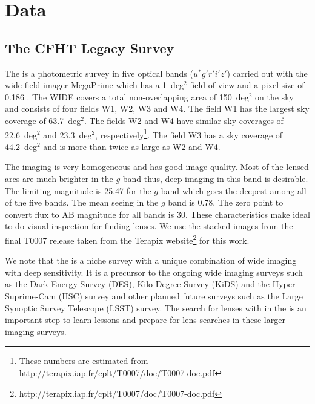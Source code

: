 \documentclass[useAMS,usenatbib,a4paper]{mn2e}
\begin{document}

\section{Data}
\label{sec:data}
\subsection{The CFHT Legacy Survey}
\label{sec:data:cfhtls}

The \cfhtls is a photometric survey in five optical bands
($u^*g'r'i'z'$) carried out with the wide-field imager MegaPrime which
has a 1~deg$^2$ field-of-view and a pixel size of 0.186\arcsec
\citep{Gwyn2012}. The \cfhtls \textsc{WIDE} covers a total
non-overlapping area of 150~deg$^2$ on the sky and consists of four
fields W1, W2, W3 and W4. The field W1 has the largest sky coverage of
63.7~deg$^2$. The fields W2 and W4 have similar sky coverages of
22.6~deg$^2$ and 23.3~deg$^2$, respectively\footnote{These numbers are
estimated from http://terapix.iap.fr/cplt/T0007/doc/T0007-doc.pdf}.  The
field W3 has a sky coverage of 44.2~deg$^2$ and is more than twice as
large as W2 and W4.

The \cfhtls imaging is very homogeneous and has good image quality. Most
of the lensed arcs are much brighter in the $g$ band thus, deep imaging
in this band is desirable. The limiting magnitude is 25.47 for the $g$
band which goes the deepest among all of the five bands. The mean seeing
in the $g$ band is 0.78\arcsec. The zero point to convert flux to AB
magnitude for all bands is 30. These characteristics make \cfhtls ideal
to do visual inspection for finding lenses.  We use the stacked images
from the final T0007 release taken from the Terapix
website\footnote{{http://terapix.iap.fr/cplt/T0007/doc/T0007-doc.pdf}} for this
work.

We note that the \cfhtls is a niche survey with a unique combination of wide
imaging with deep sensitivity. It is a precursor to the ongoing wide imaging
surveys such as the Dark Energy Survey (DES), Kilo Degree Survey (KiDS) and the
Hyper Suprime-Cam (HSC) survey and other planned future surveys such as the
Large Synoptic Survey Telescope (LSST) survey.  The search for lenses with \sw
in the \cfhtls is an important step to learn lessons and prepare for lens
searches in these larger imaging surveys.


\end{document}
